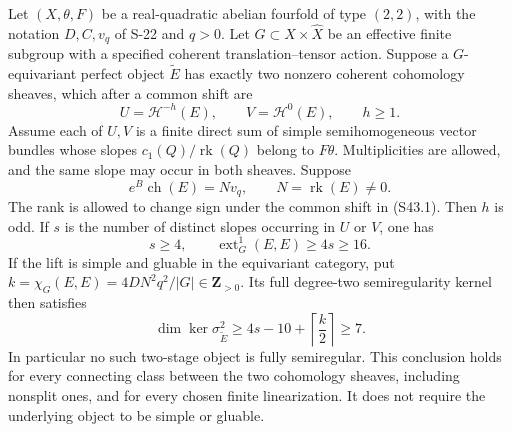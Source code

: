 \begin{theorem}
\label{thm:semireg-two-semihomogeneous-stages}
Let $(X,\theta,F)$ be a real-quadratic abelian fourfold of type
$(2,2)$, with the notation $D,C,v_q$ of S-22 and $q>0$.
Let $G\subset X\times\widehat X$ be an effective finite subgroup
with a specified coherent translation--tensor action. Suppose a
$G$-equivariant perfect object $\widetilde E$ has exactly two
nonzero coherent cohomology sheaves, which after a common shift
are
\[
 U=\mathcal H^{-h}(E),\qquad V=\mathcal H^0(E),\qquad h\ge1.
 \tag{S43.1}
\]
Assume each of $U,V$ is a finite direct sum of simple
semihomogeneous vector bundles whose slopes $c_1(Q)/\operatorname{rk}(Q)$
belong to $F\theta$. Multiplicities are allowed, and the same
slope may occur in both sheaves. Suppose
\[
 e^B\operatorname{ch}(E)=Nv_q,
 \qquad N=\operatorname{rk}(E)\ne0.
 \tag{S43.2}
\]
The rank is allowed to change sign under the common shift in (S43.1).
Then $h$ is odd. If $s$ is the number of distinct slopes occurring
in $U$ or $V$, one has
\[
 s\ge4,\qquad
 \operatorname{ext}^1_G(E,E)\ge4s\ge16.
 \tag{S43.3}
\]
If the lift is simple and gluable in the equivariant category,
put $k=\chi_G(E,E)=4DN^2q^2/|G|\in\mathbf Z_{>0}$. Its full
degree-two semiregularity kernel then satisfies
\[
 \boxed{\dim\ker\sigma^2_{\widetilde E}
       \ge 4s-10+\left\lceil\frac{k}{2}\right\rceil
       \ge7.}
 \tag{S43.4}
\]
In particular no such two-stage object is fully semiregular.
This conclusion holds for every connecting class between the
two cohomology sheaves, including nonsplit ones, and for every
chosen finite linearization. It does not require the underlying
object to be simple or gluable.
\end{theorem}
